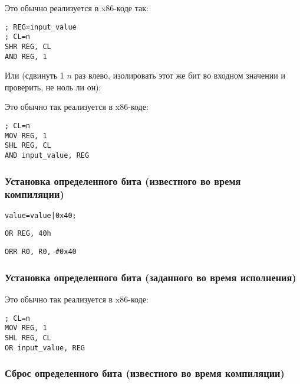 Это обычно реализуется в x86-коде так:

\begin{lstlisting}[caption=x86,style=customasmx86]
; REG=input_value
; CL=n
SHR REG, CL
AND REG, 1
\end{lstlisting}

Или (сдвинуть 1 $n$ раз влево, изолировать этот же бит во входном значении и проверить, не ноль ли он):



Это обычно так реализуется в x86-коде:

\begin{lstlisting}[caption=x86,style=customasmx86]
; CL=n
MOV REG, 1
SHL REG, CL
AND input_value, REG
\end{lstlisting}

\subsubsection{Установка определенного бита (известного во время компиляции)}

\begin{lstlisting}[caption=\CCpp,style=customc]
value=value|0x40;
\end{lstlisting}

\begin{lstlisting}[caption=x86,style=customasmx86]
OR REG, 40h
\end{lstlisting}

\begin{lstlisting}[caption=ARM (\ARMMode) и ARM64,style=customasmARM]
ORR R0, R0, #0x40
\end{lstlisting}

\subsubsection{Установка определенного бита (заданного во время исполнения)}



Это обычно так реализуется в x86-коде:

\begin{lstlisting}[caption=x86,style=customasmx86]
; CL=n
MOV REG, 1
SHL REG, CL
OR input_value, REG
\end{lstlisting}

\subsubsection{Сброс определенного бита (известного во время компиляции)}

